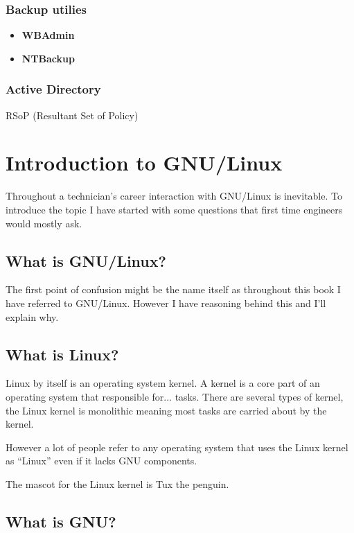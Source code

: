 \documentclass{article}
\begin{document}
\subsubsection{Backup utilies}

\begin{itemize}
\item \textbf{WBAdmin}
\item \textbf{NTBackup}
\end{itemize}


\subsubsection{Active Directory}

RSoP (Resultant Set of Policy)


\section{Introduction to GNU/Linux}

Throughout a technician's career interaction with GNU/Linux is inevitable. To introduce the topic I have started with some questions that first time engineers would mostly ask.

\subsection{What is GNU/Linux?}

The first point of confusion might be the name itself as throughout this book I have referred to GNU/Linux. However I have reasoning behind this and I'll explain why.

\subsection{What is Linux?}

Linux by itself is an operating system kernel. A kernel is a core part of an operating system that responsible for... tasks. There are several types of kernel, the Linux kernel is monolithic meaning most tasks are carried about by the kernel.

However a lot of people refer to any operating system that uses the Linux kernel as ``Linux'' even if it lacks GNU components.

The mascot for the Linux kernel is Tux the penguin. %

\subsection{What is GNU?}
\end{document}
